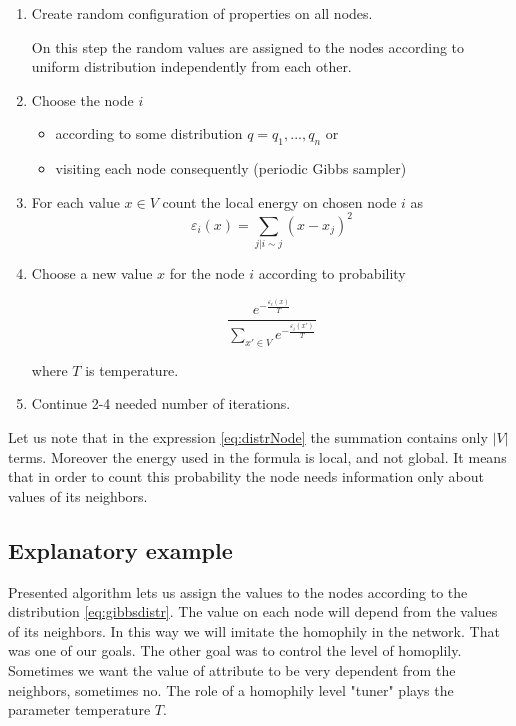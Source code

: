 \documentclass[12pt]{report}
\begin{document}
\begin{enumerate}
  \item Create random configuration of properties on all nodes.
  
  On this step the random values are assigned to the nodes according to uniform distribution independently from each other.
    
  \item Choose the node $i$
  
 	 \begin{itemize}
		\item according to some distribution $q = q_1, ..., q_n$ or
		\item visiting each node consequently (periodic Gibbs sampler)
 	 \end{itemize}
  
  \item For each value $x \in V$ count the local energy on chosen node $i$ as 
  $$ \varepsilon_i(x) = \sum\limits_{j | i \sim j}  (x - x_j)^2 $$  
  
  \item Choose a new value $x$ for the node $i$ according to probability
  
  \begin{equation}
 	 \frac{ e^{-\frac{\varepsilon_i(x)}{T}} }{ \sum\limits_{x'\in V} e^{-\frac{\varepsilon_i(x')}{T}}} 
 \label{eq:distrNode}
  \end{equation}
  
  
  
	where $T$ is temperature.
\item Continue 2-4 needed number of iterations.
\end{enumerate}

Let us note that in the expression \ref{eq:distrNode} the summation contains only $|V|$ terms. Moreover the energy used in the formula is local, and not global. It means that in order to count this probability the node needs information only about values of its neighbors.

\subsection{Explanatory example} 

Presented algorithm lets us assign the values to the nodes according to the distribution \ref{eq:gibbsdistr}. The value on each node will depend from the values of its neighbors. In this way we will imitate the homophily in the network. That was one of our goals. The other goal was to control the level of homoplily. Sometimes we want the value of attribute to be very dependent from the neighbors, sometimes no. The role of a homophily level "tuner" plays the parameter temperature $T$.
\end{document}
